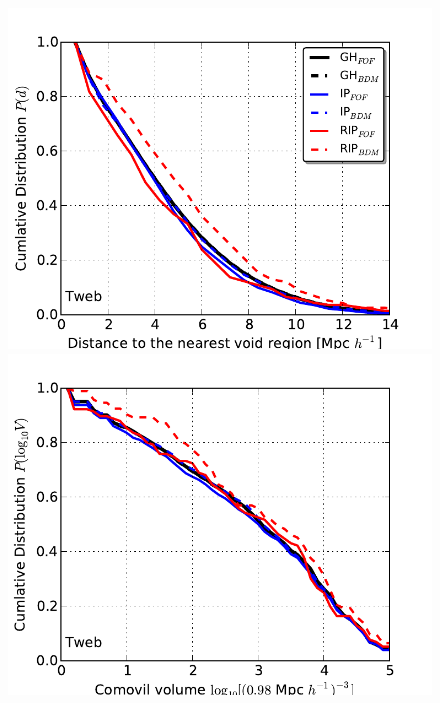 \documentclass[usenatbib]{latex/mn2e}
\begin{document}
\begin{flushleft}
\begin{figure}
\begin{center}

  \includegraphics[trim = 0mm 0mm 0mm 0mm, clip, keepaspectratio=true,
  width=0.3\textheight]{./figures/voids_distances_samples_Tweb}
  \includegraphics[trim = 0mm 0mm 0mm 0mm, clip, keepaspectratio=true,
  width=0.3\textheight]{./figures/voids_sizes_samples_Tweb}
  

\end{center}
\end{figure}
\end{flushleft}
\end{document}
